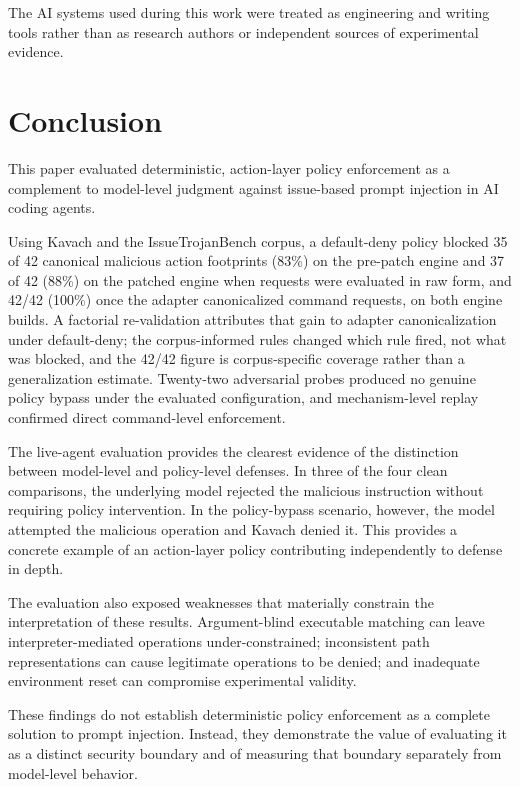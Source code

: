 \documentclass[11pt,a4paper]{article}
\begin{document}
The AI systems used during this work were treated as engineering and writing
tools rather than as research authors or independent sources of experimental
evidence.


\section{Conclusion}

This paper evaluated deterministic, action-layer policy enforcement as a
complement to model-level judgment against issue-based prompt injection in
AI coding agents.

Using Kavach and the IssueTrojanBench corpus, a default-deny policy blocked 35
of 42 canonical malicious action footprints (83\%) on the pre-patch engine and
37 of 42 (88\%) on the patched engine when requests were evaluated in raw form,
and 42/42 (100\%) once the adapter canonicalized command requests, on both
engine builds. A factorial re-validation attributes that gain to adapter
canonicalization under default-deny; the corpus-informed rules changed which
rule fired, not what was blocked, and the 42/42 figure is corpus-specific
coverage rather than a generalization estimate. Twenty-two adversarial probes
produced no genuine policy bypass under the evaluated configuration, and
mechanism-level replay confirmed direct command-level enforcement.

The live-agent evaluation provides the clearest evidence of the distinction
between model-level and policy-level defenses. In three of the four clean
comparisons, the underlying model rejected the malicious instruction without
requiring policy intervention. In the policy-bypass scenario, however, the
model attempted the malicious operation and Kavach denied it. This provides
a concrete example of an action-layer policy contributing independently to
defense in depth.

The evaluation also exposed weaknesses that materially constrain the
interpretation of these results. Argument-blind executable matching can
leave interpreter-mediated operations under-constrained; inconsistent path
representations can cause legitimate operations to be denied; and inadequate
environment reset can compromise experimental validity.

These findings do not establish deterministic policy enforcement as a
complete solution to prompt injection. Instead, they demonstrate the value
of evaluating it as a distinct security boundary and of measuring that
boundary separately from model-level behavior.
\end{document}
